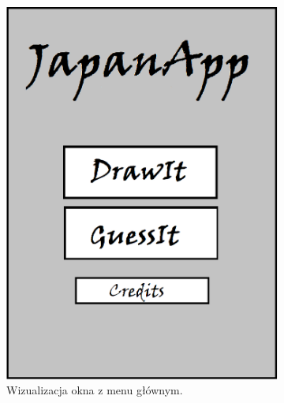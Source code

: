 \documentclass[15pt]{article}
\begin{document}
\begin{figure}[h!]
  \centering
  \begin{subfigure}[b]{0.35\linewidth}
    \includegraphics[width=\linewidth]{menu.png}
    \caption{Wizualizacja okna z menu głównym.}
  \end{subfigure}
  \begin{subfigure}[b]{0.35\linewidth}

\end{subfigure}
\end{figure}
\end{document}
